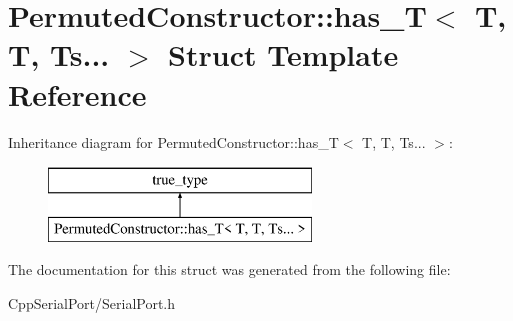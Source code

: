 \hypertarget{struct_permuted_constructor_1_1has___t_3_01_t_00_01_t_00_01_ts_8_8_8_01_4}{}\section{Permuted\+Constructor\+:\+:has\+\_\+T$<$ T, T, Ts... $>$ Struct Template Reference}
\label{struct_permuted_constructor_1_1has___t_3_01_t_00_01_t_00_01_ts_8_8_8_01_4}
Inheritance diagram for Permuted\+Constructor\+:\+:has\+\_\+T$<$ T, T, Ts... $>$\+:\begin{figure}[H]
\begin{center}
\leavevmode
\includegraphics[height=2.000000cm]{struct_permuted_constructor_1_1has___t_3_01_t_00_01_t_00_01_ts_8_8_8_01_4}
\end{center}
\end{figure}


The documentation for this struct was generated from the following file\+:\begin{DoxyCompactItemize}
\item 
Cpp\+Serial\+Port/Serial\+Port.\+h\end{DoxyCompactItemize}
